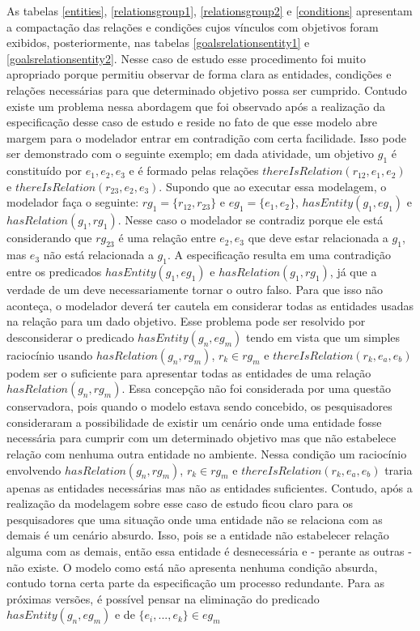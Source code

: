 As tabelas \ref{entities}, \ref{relationsgroup1}, \ref{relationsgroup2} e \ref{conditions} apresentam a compactação das relações e condições cujos vínculos com objetivos foram exibidos, 
posteriormente, nas tabelas \ref{goalsrelationsentity1} e \ref{goalsrelationsentity2}. Nesse caso de estudo esse procedimento foi muito apropriado porque permitiu observar de forma 
clara as entidades, condições e relações necessárias para que determinado objetivo possa ser cumprido. Contudo existe um problema nessa abordagem que foi observado após a realização da
especificação desse caso de estudo e reside no fato de que esse modelo abre margem para o modelador entrar em contradição com certa facilidade. Isso pode ser demonstrado com o  
seguinte exemplo; em dada atividade, um objetivo $g_1$ é constituído por $e_1,e_2,e_3$ e é formado pelas relações $thereIsRelation(r_{12},e_1,e_2)$ e $thereIsRelation(r_{23},e_2,e_3)$. 
Supondo que ao executar essa modelagem, o modelador faça o seguinte: $rg_1 = \{ r_{12},r_{23} \}$ e $ eg_1 = \{ e_1, e_2 \} $, $ hasEntity(g_1,eg_1) $ e $ hasRelation(g_1, rg_1) $. Nesse 
caso o modelador se contradiz porque ele está considerando que $rg_{23}$ é uma relação entre $e_2, e_3$ que deve estar relacionada a $g_1$, mas $e_3$ não está relacionada a $g_1$. A especificação 
resulta em uma contradição entre os predicados $ hasEntity(g_1,eg_1) $ e $ hasRelation(g_1, rg_1) $, já que a verdade de um deve necessariamente tornar 
o outro falso. Para que isso não aconteça, o modelador deverá ter cautela em considerar todas as entidades usadas na relação para um dado objetivo. Esse problema pode ser resolvido por 
desconsiderar o predicado $hasEntity(g_n,eg_m)$ tendo em vista que um simples raciocínio usando $hasRelation(g_n,rg_m)$, $r_k \in rg_m$ e $thereIsRelation(r_k, e_a,e_b)$ podem ser o suficiente 
para apresentar todas as entidades de uma relação $ hasRelation(g_n, rg_m) $. Essa concepção não foi considerada por uma questão conservadora, pois quando o modelo estava sendo concebido, 
os pesquisadores consideraram a possibilidade de existir um cenário onde uma entidade fosse necessária para cumprir com um determinado objetivo mas que não estabelece relação com nenhuma 
outra entidade no ambiente. Nessa condição um raciocínio envolvendo $hasRelation(g_n,rg_m)$, $r_k \in rg_m$ e $thereIsRelation(r_k, e_a,e_b)$ traria apenas as entidades necessárias 
mas não as entidades suficientes. Contudo, após a realização da modelagem sobre esse caso de estudo ficou claro para os pesquisadores que uma situação onde uma entidade não se relaciona 
com as demais é um cenário absurdo. Isso, pois se a entidade não estabelecer relação alguma com as demais, então essa entidade é desnecessária e - perante as outras - não existe. O modelo 
como está não apresenta nenhuma condição absurda, contudo torna certa parte da especificação um processo redundante. Para as próximas versões, é possível pensar na eliminação do predicado 
$ hasEntity(g_n,eg_m) $ e de $ \{ e_i , ... , e_k \} \in eg_m $

